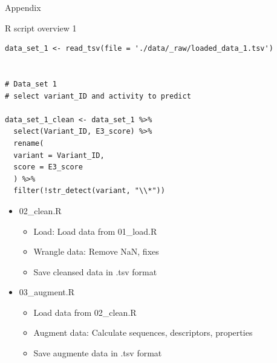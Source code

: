 \documentclass[ignorenonframetext,]{beamer}
\providecommand{\tightlist}{%
  \setlength{\itemsep}{0pt}\setlength{\parskip}{0pt}}
\begin{document}
\begin{frame}[fragile]{Appendix}
\protect\hypertarget{appendix}{}

\begin{block}{R script overview 1}

\begin{verbatim}
data_set_1 <- read_tsv(file = './data/_raw/loaded_data_1.tsv')


# Data_set 1
# select variant_ID and activity to predict

data_set_1_clean <- data_set_1 %>%
  select(Variant_ID, E3_score) %>%
  rename(
  variant = Variant_ID,
  score = E3_score
  ) %>%
  filter(!str_detect(variant, "\\*"))
\end{verbatim}

\begin{itemize}
\tightlist
\item
  02\_clean.R

  \begin{itemize}
  \tightlist
  \item
    Load: Load data from 01\_load.R
  \item
    Wrangle data: Remove NaN, fixes
  \item
    Save cleansed data in .tsv format
  \end{itemize}
\item
  03\_augment.R

  \begin{itemize}
  \tightlist
  \item
    Load data from 02\_clean.R
  \item
    Augment data: Calculate sequences, descriptors, properties
  \item
    Save augmente data in .tsv format
  \end{itemize}
\end{itemize}

\end{block}

\end{frame}
\end{document}
